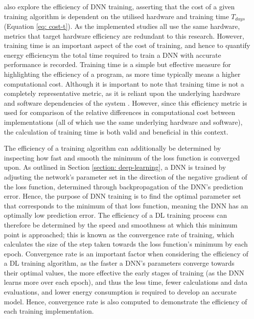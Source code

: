 \documentclass[a4paper, 11pt]{report}
\begin{document}
    \citet{amodei-2018} also explore the efficiency of DNN training, asserting that the cost of a given training algorithm is dependent on the utilised hardware and training time $T_{days}$ (Equation \ref{eq: cost-t}). As the implemented studies all use the same hardware, metrics that target hardware efficiency are redundant to this research. However, training time is an important aspect of the cost of training, and hence to quantify energy efficiencym the total time required to train a DNN with accurate performance is recorded. Training time is a simple but effective measure for highlighting the efficiency of a program, as more time typically means a higher computational cost. Although it is important to note that training time is not a completely representative metric, as it is reliant upon the underlying hardware and software dependencies of the system \citep{schwartz-2019}. However, since this efficiency metric is used for comparison of the relative differences in computational cost between implementations (all of which use the same underlying hardware and software), the calculation of training time is both valid and beneficial in this context.

    The efficiency of a training algorithm can additionally be determined by inspecting how fast and smooth the minimum of the loss function is converged upon. As outlined in Section \ref{section: deep-learning}, a DNN is trained by adjusting the network's parameter set in the direction of the negative gradient of the loss function, determined through backpropagation of the DNN's prediction error. Hence, the purpose of DNN training is to find the optimal parameter set that corresponds to the minimum of that loss function, meaning the DNN has an optimally low prediction error. The efficiency of a DL training process can therefore be determined by the speed and smoothness at which this minimum point is approached; this is known as the convergence rate of training, which calculates the size of the step taken towards the loss function's minimum by each epoch. Convergence rate is an important factor when considering the efficiency of a DL training algorithm, as the faster a DNN's parameters converge towards their optimal values, the more effective the early stages of training (as the DNN learns more over each epoch), and thus the less time, fewer calculations and data evaluations, and lower energy consumption is required to develop an accurate model. Hence, convergence rate is also computed to demonstrate the efficiency of each training implementation.
\end{document}
